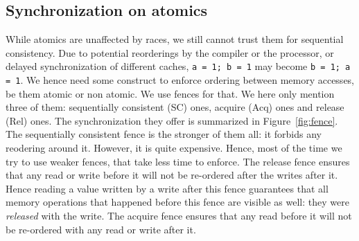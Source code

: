 \subsection{Synchronization on atomics}
While atomics are unaffected by races, we still cannot trust them for sequential consistency. Due to potential reorderings by the compiler or the processor, or delayed synchronization of different caches, \texttt{a = 1; b = 1} may become \texttt{b = 1; a = 1}. We hence need some construct to enforce ordering between memory accesses, be them atomic or non atomic. We use fences for that. We here only mention three of them: sequentially consistent (SC) ones, acquire (Acq) ones and release (Rel) ones. The synchronization they offer is summarized in Figure~\ref{fig:fence}. The sequentially consistent fence is the stronger of them all: it forbids any reodering around it. However, it is quite expensive. Hence, most of the time we try to use weaker fences, that take less time to enforce. The release fence ensures that any read or write before it will not be re-ordered after the writes after it. Hence reading a value written by a write after this fence guarantees that all memory operations that happened before this fence are visible as well: they were \emph{released} with the write. The acquire fence ensures that any read before it will not be re-ordered with any read or write after it.

